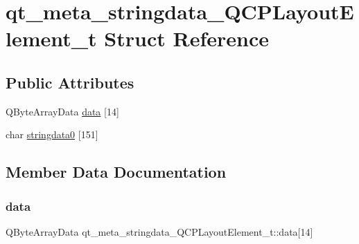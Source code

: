 \hypertarget{structqt__meta__stringdata___q_c_p_layout_element__t}{}\section{qt\+\_\+meta\+\_\+stringdata\+\_\+\+Q\+C\+P\+Layout\+Element\+\_\+t Struct Reference}
\label{structqt__meta__stringdata___q_c_p_layout_element__t}
\subsection*{Public Attributes}
\begin{DoxyCompactItemize}
\item 
Q\+Byte\+Array\+Data \mbox{\hyperlink{structqt__meta__stringdata___q_c_p_layout_element__t_af0ea5ebb7857a9736eb348abd41c58dc}{data}} \mbox{[}14\mbox{]}
\item 
char \mbox{\hyperlink{structqt__meta__stringdata___q_c_p_layout_element__t_a9f6b0973752e4c3c20011438c7a6351c}{stringdata0}} \mbox{[}151\mbox{]}
\end{DoxyCompactItemize}


\subsection{Member Data Documentation}
\mbox{\label{structqt__meta__stringdata___q_c_p_layout_element__t_af0ea5ebb7857a9736eb348abd41c58dc}} 
\subsubsection{\texorpdfstring{data}{data}}
{\footnotesize\ttfamily Q\+Byte\+Array\+Data qt\+\_\+meta\+\_\+stringdata\+\_\+\+Q\+C\+P\+Layout\+Element\+\_\+t\+::data\mbox{[}14\mbox{]}}

\mbox{\label{structqt__meta__stringdata___q_c_p_layout_element__t_a9f6b0973752e4c3c20011438c7a6351c}} 
